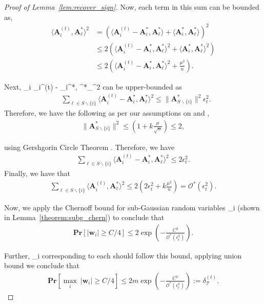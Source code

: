 \documentclass{article}
\newcommand{\HT}{{\c{T}}}
\def\[#1\]{{$#1$}}
\def\b#1{{\mathbf{#1}}}
\def\c#1{{\mathcal{#1}}}
\begin{document}
\begin{proof}[Proof of Lemma~\ref{lem:recover_sign}]
	Now, each term in this sum can be bounded as,
	\begin{align*}
	\langle \b{A}_i^{(t)}, \b{A}^*_\ell \rangle^2 &= (\langle \b{A}_i^{(t)} - \b{A}_i^*, \b{A}^*_\ell\rangle + \langle \b{A}_i^*, \b{A}^*_\ell\rangle)^2\\
	&\leq 2(\langle \b{A}_i^{(t)} - \b{A}_i^*, \b{A}^*_\ell\rangle^2 + \langle \b{A}_i^*, \b{A}^*_\ell\rangle^2)\\
	&\leq 2(\langle \b{A}_i^{(t)} - \b{A}_i^*, \b{A}^*_\ell\rangle^2 + \tfrac{\mu^2}{n}).
	\end{align*}
	
	Next, \[\textstyle\sum\limits_{\ell\neq i} \langle \b{A}_i^{(t)} - \b{A}_i^*, \b{A}^*_\ell\rangle^2\] can be upper-bounded as	
	\begin{align*}
	&\textstyle\sum\limits_{\ell \in S\backslash \{i\}} \langle \b{A}_i^{(t)} - \b{A}_i^*, \b{A}^*_\ell\rangle^2 
	\leq \|\b{A}_{S\backslash{\{i\}}}^{*}\|^2 \epsilon_t^2.
	\end{align*}
	Therefore, we have the following as per our assumptions on \[\mu\] and \[k\], 
	\begin{align*}
	\|\b{A}_{S\backslash{\{i\}}}^{*}\|^2 \leq  (1 + k \tfrac{\mu}{\sqrt{n}}) \leq 2,
	\end{align*}
	
	using Gershgorin Circle Theorem \citep{Gershgorin1931}. Therefore, we have
	\begin{align*}
	\textstyle\sum\limits_{\ell \in S\backslash \{i\}} \langle \b{A}^{(t)}_i - \b{A}_i^*, \b{A}^*_\ell\rangle^2 \leq 2\epsilon_t^2.
	\end{align*}
	Finally, we have that 
	\begin{align*}
	\textstyle\sum\limits_{\ell \in S\backslash \{i\}}\langle \b{A}_i^{(t)}, \b{A}^*_\ell \rangle^2
	\leq 2( 2\epsilon^2_t + k \tfrac{\mu^2}{n}) = \mathcal{O}^*(\epsilon_t^2).
	\end{align*}
	
	Now, we apply the Chernoff bound for sub-Gaussian random variables \[\b{w}_i\] (shown in Lemma~\ref{theorem:subg_chern}) to conclude that
	\begin{align*}
	\mathbf{Pr}[|\b{w}_i|\geq C/4] \leq 2\exp(-\tfrac{C^2}{ \mathcal{O}^*(\epsilon_t^2)}).
	\end{align*}
	
	Further, \[\b{w}_i\] corresponding to each \[m\] should follow this bound, applying union bound we conclude that 
	\begin{align*}
	\mathbf{Pr}[ \underset{i}{\max}~|\b{w}_i| \geq C/4] \leq 2m\exp(-\tfrac{C^2}{\mathcal{O}^*(\epsilon_t^2)}) := \delta_{\HT}^{(t)} .
	\end{align*}
	

\end{proof}
\end{document}
